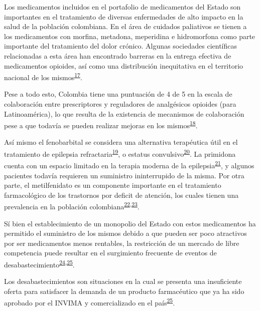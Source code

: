 \documentclass[
]{book}
\begin{document}
Los medicamentos incluidos en el portafolio de medicamentos del Estado son importantes en el tratamiento de diversas enfermedades de alto impacto en la salud de la población colombiana. En el área de cuidados paliativos se tienen a los medicamentos con morfina, metadona, meperidina e hidromorfona como parte importante del tratamiento del dolor crónico. Algunas sociedades científicas relacionadas a esta área han encontrado barreras en la entrega efectiva de medicamentos opioides, así como una distribución inequitativa en el territorio nacional de los mismos\textsuperscript{\protect\hyperlink{ref-LeonDelgado2018}{17}}.

Pese a todo esto, Colombia tiene una puntuación de 4 de 5 en la escala de colaboración entre prescriptores y reguladores de analgésicos opioides (para Latinoamérica), lo que resulta de la existencia de mecanismos de colaboración pese a que todavía se pueden realizar mejoras en los mismos\textsuperscript{\protect\hyperlink{ref-Pastrana2020}{18}}.

Así mismo el fenobarbital se considera una alternativa terapéutica útil en el tratamiento de epilepsia refractaria\textsuperscript{\protect\hyperlink{ref-WatsonLewis2014}{19}}, o estatus convulsivo\textsuperscript{\protect\hyperlink{ref-VergaraAguilar2019}{20}}. La primidona cuenta con un espacio limitado en la terapia moderna de la epilepsia\textsuperscript{\protect\hyperlink{ref-Johannessen2020}{21}}, y algunos pacientes todavía requieren un suministro ininterrupido de la misma. Por otra parte, el metilfenidato es un componente importante en el tratamiento farmacológico de los trastornos por deficit de atención, los cuales tienen una prevalencia en la población colombiana\textsuperscript{\protect\hyperlink{ref-Pineda2001}{22},\protect\hyperlink{ref-Llanos-Lizcanoa2019}{23}}.

Sí bien el establecimiento de un monopolio del Estado con estos medicamentos ha permitido el suministro de los mismos debido a que pueden ser poco atractivos por ser medicamentos menos rentables, la restricción de un mercado de libre competencia puede resultar en el surgimiento frecuente de eventos de desabastecimiento\textsuperscript{\protect\hyperlink{ref-LopezLopez2021}{24},\protect\hyperlink{ref-INVIMA2018-Desabast}{25}}.

Los desabastecimientos son situaciones en la cual se presenta una insuficiente oferta para satisfacer la demanda de un producto farmacéutico que ya ha sido aprobado por el INVIMA y comercializado en el país\textsuperscript{\protect\hyperlink{ref-INVIMA2018-Desabast}{25}}.
\end{document}
